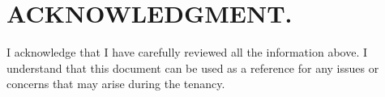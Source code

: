 	\vfill
	\section*{ACKNOWLEDGMENT.}
	I acknowledge that I have carefully reviewed all the information above. I understand that this document can be used as a reference for any issues or concerns that may arise during the tenancy.\\


